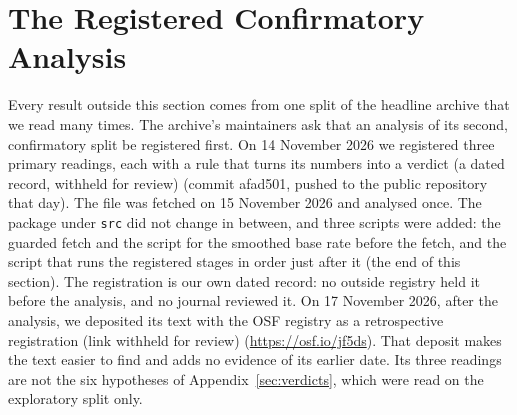 \section{The Registered Confirmatory Analysis}
\label{sec:confirmatory}
Every result outside this section comes from one split of the headline archive that we read many times. The archive's maintainers ask that an analysis of its second, confirmatory split be registered first. On 14 November 2026 we registered three primary readings, each with a rule that turns its numbers into a verdict\iftmlr{} (a dated record, withheld for review)\else{} (commit afad501, pushed to the public repository that day)\fi. The file was fetched on 15 November 2026 and analysed once. The package under \texttt{src} did not change in between, and three scripts were added: the guarded fetch and the script for the smoothed base rate before the fetch, and the script that runs the registered stages in order just after it (the end of this section). The registration is our own dated record: no outside registry held it before the analysis, and no journal reviewed it. On 17 November 2026, after the analysis, we deposited its text with the OSF registry as a retrospective registration\iftmlr{} (link withheld for review)\else{} (\url{https://osf.io/jf5ds})\fi. That deposit makes the text easier to find and adds no evidence of its earlier date. Its three readings are not the six hypotheses of Appendix~\ref{sec:verdicts}, which were read on the exploratory split only.


